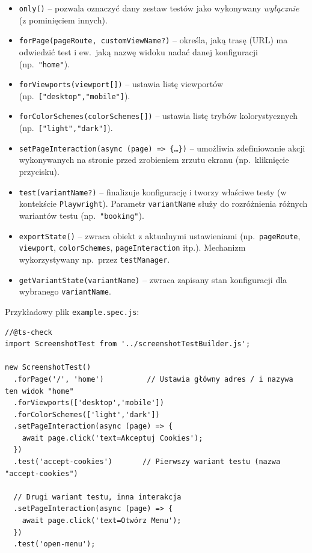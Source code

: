 \documentclass[12pt]{report}
\begin{document}
\begin{itemize}
  \item \texttt{only()} -- pozwala oznaczyć dany zestaw testów jako wykonywany \emph{wyłącznie} (z pominięciem innych).  
  \item \texttt{forPage(pageRoute, customViewName?)} -- określa, jaką trasę (URL) ma odwiedzić test i ew.~jaką nazwę widoku nadać danej konfiguracji (np.~\texttt{"home"}).
  \item \texttt{forViewports(viewport[])} -- ustawia listę viewportów (np.~\texttt{["desktop","mobile"]}).
  \item \texttt{forColorSchemes(colorSchemes[])} -- ustawia listę trybów kolorystycznych (np.~\texttt{["light","dark"]}).
  \item \texttt{setPageInteraction(async (page) => \{\ldots\})} -- umożliwia zdefiniowanie akcji wykonywanych na stronie przed zrobieniem zrzutu ekranu (np.~kliknięcie przycisku).
  \item \texttt{test(variantName?)} -- finalizuje konfigurację i tworzy właściwe testy (w kontekście \texttt{Playwright}). Parametr \texttt{variantName} służy do rozróżnienia różnych wariantów testu (np.~\texttt{"booking"}).
  \item \texttt{exportState()} -- zwraca obiekt z aktualnymi ustawieniami (np.~\texttt{pageRoute}, \texttt{viewport}, \texttt{colorSchemes}, \texttt{pageInteraction} itp.). Mechanizm wykorzystywany np.~przez \texttt{testManager}.
  \item \texttt{getVariantState(variantName)} -- zwraca zapisany stan konfiguracji dla wybranego \texttt{variantName}.
\end{itemize}

\noindent Przykładowy plik \texttt{example.spec.js}:

\begin{verbatim}
//@ts-check
import ScreenshotTest from '../screenshotTestBuilder.js';

new ScreenshotTest()
  .forPage('/', 'home')          // Ustawia główny adres / i nazywa ten widok "home"
  .forViewports(['desktop','mobile'])
  .forColorSchemes(['light','dark'])
  .setPageInteraction(async (page) => {
    await page.click('text=Akceptuj Cookies');
  })
  .test('accept-cookies')       // Pierwszy wariant testu (nazwa "accept-cookies")

  // Drugi wariant testu, inna interakcja
  .setPageInteraction(async (page) => {
    await page.click('text=Otwórz Menu');
  })
  .test('open-menu');
\end{verbatim}
\end{document}
